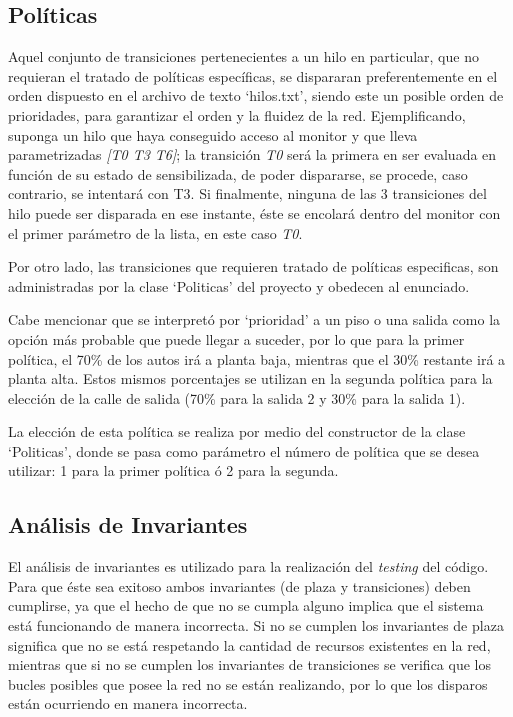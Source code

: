 \documentclass[12pt,a4paper]{article}
\begin{document}
\subsection{Políticas}
Aquel conjunto de transiciones pertenecientes a un hilo en particular, que no requieran el tratado de políticas específicas, se dispararan preferentemente en el orden dispuesto en el archivo de texto `hilos.txt', siendo este un posible orden de prioridades, para garantizar el orden y la fluidez de la red. Ejemplificando, suponga un hilo que haya conseguido acceso al monitor y que lleva parametrizadas \textit{[T0    T3    T6]}; la transición \textit{T0} será la primera en ser evaluada en función de su estado de sensibilizada, de poder dispararse, se procede, caso contrario, se intentará con T3. Si finalmente, ninguna de las 3 transiciones del hilo puede ser disparada en ese instante, éste se encolará dentro del monitor con el primer parámetro de la lista, en este caso \textit{T0}.

Por otro lado, las transiciones que requieren tratado de políticas especificas, son administradas por la clase `Politicas' del proyecto y obedecen al enunciado.

Cabe mencionar que se interpretó por `prioridad' a un piso o una salida como la opción más probable que puede llegar a suceder, por lo que para la primer política, el 70\% de los autos irá a planta baja, mientras que el 30\% restante irá a planta alta. Estos mismos porcentajes se utilizan en la segunda política para la elección de la calle de salida (70\% para la salida 2 y 30\% para la salida 1).

La elección de esta política se realiza por medio del constructor de la clase `Politicas', donde se pasa como parámetro el número de política que se desea utilizar: 1 para la primer política ó 2 para la segunda.

\subsection{Análisis de Invariantes}
El análisis de invariantes es utilizado para la realización del \emph{testing} del código. Para que éste sea exitoso ambos invariantes (de plaza y transiciones) deben cumplirse, ya que el hecho de que no se cumpla alguno implica que el sistema está funcionando de manera incorrecta. Si no se cumplen los invariantes de plaza significa que no se está respetando la cantidad de recursos existentes en la red, mientras que si no se cumplen los invariantes de transiciones se verifica que los bucles posibles que posee la red no se están realizando, por lo que los disparos están ocurriendo en manera incorrecta. 
\end{document}
